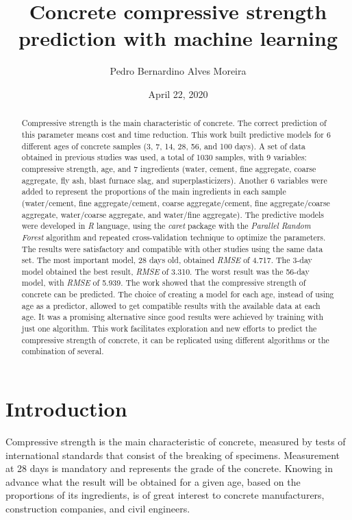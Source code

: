 \documentclass[
]{article}
\title{Concrete compressive strength prediction with machine learning}
\author{Pedro Bernardino Alves Moreira}
\date{April 22, 2020}
\begin{document}
\maketitle
\begin{abstract}
Compressive strength is the main characteristic of concrete. The correct
prediction of this parameter means cost and time reduction. This work
built predictive models for 6 different ages of concrete samples (3, 7,
14, 28, 56, and 100 days). A set of data obtained in previous studies
was used, a total of 1030 samples, with 9 variables: compressive
strength, age, and 7 ingredients (water, cement, fine aggregate, coarse
aggregate, fly ash, blast furnace slag, and superplasticizers). Another
6 variables were added to represent the proportions of the main
ingredients in each sample (water/cement, fine aggregate/cement, coarse
aggregate/cement, fine aggregate/coarse aggregate, water/coarse
aggregate, and water/fine aggregate). The predictive models were
developed in \emph{R} language, using the \emph{caret} package with the
\emph{Parallel Random Forest} algorithm and repeated cross-validation
technique to optimize the parameters. The results were satisfactory and
compatible with other studies using the same data set. The most
important model, 28 days old, obtained \emph{RMSE} of 4.717. The 3-day
model obtained the best result, \emph{RMSE} of 3.310. The worst result
was the 56-day model, with \emph{RMSE} of 5.939. The work showed that
the compressive strength of concrete can be predicted. The choice of
creating a model for each age, instead of using age as a predictor,
allowed to get compatible results with the available data at each age.
It was a promising alternative since good results were achieved by
training with just one algorithm. This work facilitates exploration and
new efforts to predict the compressive strength of concrete, it can be
replicated using different algorithms or the combination of several.
\end{abstract}

\newpage
\tableofcontents
\newpage
\listoffigures
\listoftables
\newpage

\hypertarget{introduction}{%
\section{Introduction}\label{introduction}}

Compressive strength is the main characteristic of concrete, measured by
tests of international standards that consist of the breaking of
specimens. Measurement at 28 days is mandatory and represents the grade
of the concrete. Knowing in advance what the result will be obtained for
a given age, based on the proportions of its ingredients, is of great
interest to concrete manufacturers, construction companies, and civil
engineers.
\end{document}
